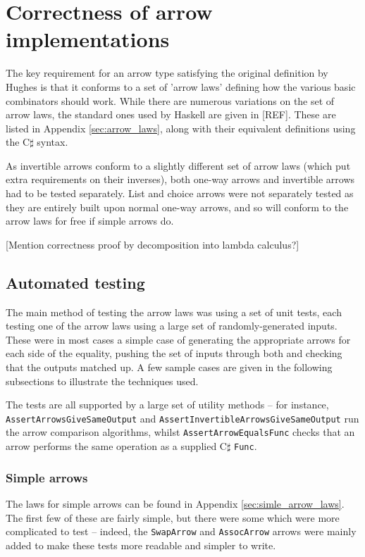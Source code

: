 \documentclass[12pt,twoside,notitlepage]{report}
\begin{document}
\section{Correctness of arrow implementations}

The key requirement for an arrow type satisfying the original definition by Hughes is that it conforms to a set of 'arrow laws' defining how the various basic combinators should work. While there are numerous variations on the set of arrow laws, the standard ones used by Haskell are given in [REF]. These are listed in Appendix \ref{sec:arrow_laws}, along with their equivalent definitions using the C$\sharp$ syntax.

As invertible arrows conform to a slightly different set of arrow laws (which put extra requirements on their inverses), both one-way arrows and invertible arrows had to be tested separately. List and choice arrows were not separately tested as they are entirely built upon normal one-way arrows, and so will conform to the arrow laws for free if simple arrows do.

[Mention correctness proof by decomposition into lambda calculus?]

\subsection{Automated testing}

The main method of testing the arrow laws was using a set of unit tests, each testing one of the arrow laws using a large set of randomly-generated inputs. These were in most cases a simple case of generating the appropriate arrows for each side of the equality, pushing the set of inputs through both and checking that the outputs matched up. A few sample cases are given in the following subsections to illustrate the techniques used.

The tests are all supported by a large set of utility methods -- for instance, \texttt{AssertArrowsGiveSameOutput} and \texttt{AssertInvertibleArrowsGiveSameOutput} run the arrow comparison algorithms, whilst \texttt{AssertArrowEqualsFunc} checks that an arrow performs the same operation as a supplied C$\sharp$ \texttt{Func}.

\subsubsection{Simple arrows}

The laws for simple arrows can be found in Appendix \ref{sec:simle_arrow_laws}. The first few of these are fairly simple, but there were some which were more complicated to test -- indeed, the \texttt{SwapArrow} and \texttt{AssocArrow} arrows were mainly added to make these tests more readable and simpler to write.
\end{document}
